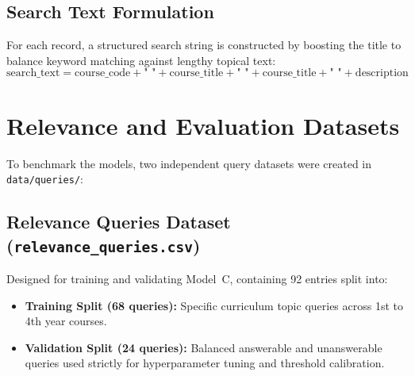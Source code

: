 \documentclass[12pt,a4paper]{report}
\begin{document}
\subsection{Search Text Formulation}
For each record, a structured search string is constructed by boosting the title to balance keyword matching against lengthy topical text:
\begin{equation}
    \text{search\_text} = \text{course\_code} + \text{" "} + \text{course\_title} + \text{" "} + \text{course\_title} + \text{" "} + \text{description}
\end{equation}

\section{Relevance and Evaluation Datasets}
To benchmark the models, two independent query datasets were created in \texttt{data/queries/}:

\subsection{Relevance Queries Dataset (\texttt{relevance\_queries.csv})}
Designed for training and validating Model~C, containing 92 entries split into:
\begin{itemize}
    \item \textbf{Training Split (68 queries):} Specific curriculum topic queries across 1st to 4th year courses.
    \item \textbf{Validation Split (24 queries):} Balanced answerable and unanswerable queries used strictly for hyperparameter tuning and threshold calibration.
\end{itemize}
\end{document}
